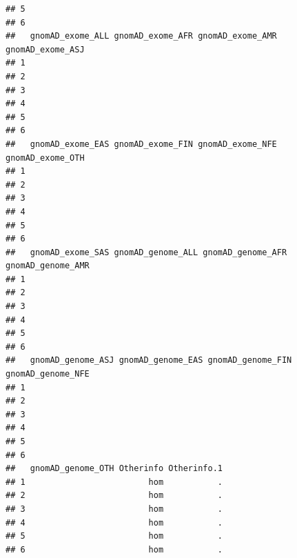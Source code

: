 \documentclass[
]{article}
\begin{document}
\begin{verbatim}
## 5                                                                          
## 6                                                                          
##   gnomAD_exome_ALL gnomAD_exome_AFR gnomAD_exome_AMR gnomAD_exome_ASJ
## 1                                                                    
## 2                                                                    
## 3                                                                    
## 4                                                                    
## 5                                                                    
## 6                                                                    
##   gnomAD_exome_EAS gnomAD_exome_FIN gnomAD_exome_NFE gnomAD_exome_OTH
## 1                                                                    
## 2                                                                    
## 3                                                                    
## 4                                                                    
## 5                                                                    
## 6                                                                    
##   gnomAD_exome_SAS gnomAD_genome_ALL gnomAD_genome_AFR gnomAD_genome_AMR
## 1                                                                       
## 2                                                                       
## 3                                                                       
## 4                                                                       
## 5                                                                       
## 6                                                                       
##   gnomAD_genome_ASJ gnomAD_genome_EAS gnomAD_genome_FIN gnomAD_genome_NFE
## 1                                                                        
## 2                                                                        
## 3                                                                        
## 4                                                                        
## 5                                                                        
## 6                                                                        
##   gnomAD_genome_OTH Otherinfo Otherinfo.1
## 1                         hom           .
## 2                         hom           .
## 3                         hom           .
## 4                         hom           .
## 5                         hom           .
## 6                         hom           .
\end{verbatim}
\end{document}
